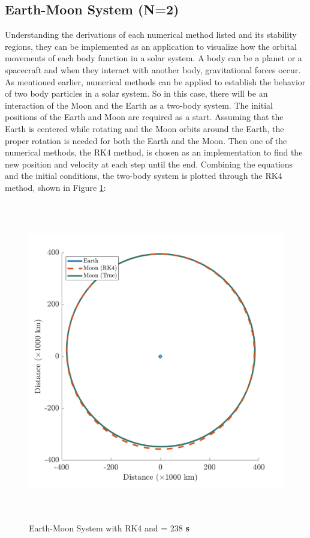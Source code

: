 \documentclass[conf]{new-aiaa}
\begin{document}
    \subsection{Earth-Moon System (N=2)}
    Understanding the derivations of each numerical method listed and its stability regions, they can be implemented as an application to visualize how the orbital movements of each body function in a solar system. A body can be a planet or a spacecraft and when they interact with another body, gravitational forces occur. As mentioned earlier, numerical methods can be applied to establish the behavior of two body particles in a solar system. So in this case, there will be an interaction of the Moon and the Earth as a two-body system. The initial positions of the Earth and Moon are required as a start. Assuming that the Earth is centered while rotating and the Moon orbits around the Earth, the proper rotation is needed for both the Earth and the Moon. Then one of the numerical methods, the RK4 method, is chosen as an implementation to find the new position and velocity at each step until the end. Combining the equations and the initial conditions, the two-body system is plotted through the RK4 method, shown in Figure \ref{em_sys}:
    \begin{figure}[H]
        \centering
        \includegraphics[height = 14cm]{Figures/Implementation/EM_Sys.png}
        \caption{Earth-Moon System with RK4 and  = 238 \textbf{ s}}
        \label{em_sys}
    \end{figure}
    
\end{document}
